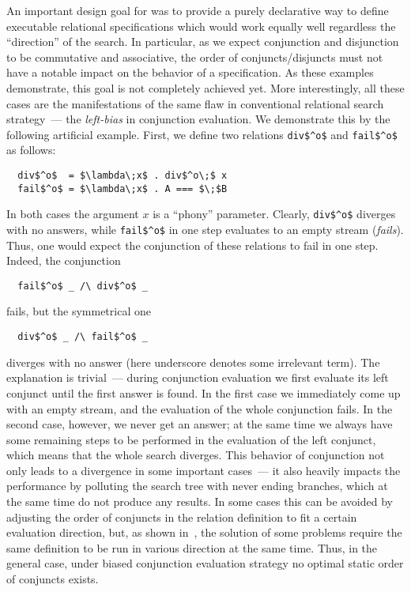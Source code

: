 An important design goal for \mk was to provide a purely declarative way to define executable relational specifications which would work equally well regardless the ``direction'' of the search.
In particular, as we expect conjunction and disjunction to be commutative and associative, the order of conjuncts/disjuncts must not have a notable impact on the behavior of
a specification. As these examples demonstrate, this goal is not completely achieved yet. More interestingly, all these cases are the manifestations of the same flaw in conventional
relational search strategy~--- the \emph{left-bias} in conjunction evaluation. We demonstrate this by the following artificial example. First, we define two relations \lstinline{div$^o$} and
\lstinline|fail$^o$| as follows:

\begin{lstlisting}
  div$^o$  = $\lambda\;x$ . div$^o\;$ x
  fail$^o$ = $\lambda\;x$ . A === $\;$B
\end{lstlisting}

In both cases the argument $x$ is a ``phony'' parameter. Clearly, \lstinline|div$^o$| diverges with no answers, while \lstinline|fail$^o$| in one step evaluates to an empty stream (\emph{fails}). Thus,
one would expect the conjunction of these relations to fail in one step. Indeed, the conjunction

\begin{lstlisting}
  fail$^o$ _ /\ div$^o$ _
\end{lstlisting}

fails, but the symmetrical one

\begin{lstlisting}
  div$^o$ _ /\ fail$^o$ _ 
\end{lstlisting}

diverges with no answer (here underscore denotes some irrelevant term). The explanation is trivial~--- during conjunction evaluation we first evaluate its left conjunct
until the first answer is found. In the first case we immediately come up with an empty stream, and the evaluation of the whole conjunction fails. In the second case,
however, we never get an answer; at the same time we always have some remaining steps to be performed in the evaluation of the left conjunct, which means that the
whole search diverges. This behavior of conjunction not only leads to a divergence in some important cases~--- it also heavily impacts the performance by polluting
the search tree with never ending branches, which at the same time do not produce any results. In some cases this can be avoided by adjusting the order of conjuncts in
the relation definition to fit a certain evaluation direction, but, as shown in~\cite{fair:DivTest}, the solution of some problems require the same definition to be run in
various direction at the same time. Thus, in the general case, under biased conjunction evaluation strategy no optimal static order of conjuncts exists.


